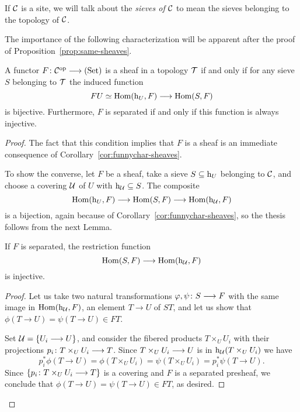 \begin{2   CONTRAVARIANT FUNCTORS}
\begin{2.3 Sheaves in Grothendieck topologies}
\begin{shaded}
\end{shaded}


If $\mathcal{C}$ is a site, we will talk about the \emph{sieves of $\mathcal{C}$} to mean the sieves belonging to the topology of $\mathcal{C}$.

The importance of the following characterization will be apparent after the proof of Proposition~\ref{prop:same-sheaves}.

\begin{proposition}\label{prop:funnychar-sheaves}%
%
%
A functor $F \colon \cC\op \arr \catset$ is a sheaf in a topology $\mathcal{T}$ if and only if for any sieve $S$ belonging to $\mathcal{T}$ the induced function
   \[
   FU \simeq \hom(\h_U, F) \arr  \hom(S, F)
   \]
is bijective. Furthermore, $F$ is separated if and only if this function is always injective.
\end{proposition}

\begin{proof}
The fact that this condition implies that $F$ is a sheaf is an immediate consequence of Corollary~\ref{cor:funnychar-sheaves}.

To show the converse, let $F$ be a sheaf, take a sieve $S \subseteq \mathrm{h}_{U}$ belonging to $\mathcal{C}$, and choose a covering $\mathcal{U}$ of $U$ with $\mathrm{h}_{\mathcal{U}} \subseteq S$. The composite
   \[
   \hom(\h_{U}, F) \arr \hom(S, F) \arr \hom(\h_{\cU}, F)
   \]
is a bijection, again because of Corollary~\ref{cor:funnychar-sheaves}, so the thesis follows from the next Lemma.

\begin{lemma}\label{lem:separated->injective}
If $F$ is separated, the restriction function
   \[
   \hom(S, F) \arr \hom(\h_{\cU}, F)
   \]
is injective.
\end{lemma}

\begin{proof}
Let us take two natural transformations $\phi, \psi \colon S \arr F$ with the same image in $\operatorname{Hom}(\mathrm{h}_{\mathcal{U}}, F)$, an element $T \to U$ of $ST$, and let us show that $\phi(T \to U) = \psi(T \to U) \in FT$.

Set $\mathcal{U} = \{U_{i} \longrightarrow U\}$, and consider the fibered products $T \times_{U} U_{i}$ with their projections $p_{i}\colon T \times_{U} U_{i} \arr T$. Since $T \times_{U} U_{i} \arr U$ is in $\mathrm{h}_{\mathcal{U}}(T \times_{U} U_{i})$ we have
   \[
   p_{i}^{*}\phi(T \to U) = \phi(T \times_{U} U_{i}) = 
   \psi(T \times_{U} U_{i}) = p_{i}^{*}\psi(T \to U).
   \]
Since $\{p_{i}\colon T \times_{U} U_{i} \arr T\}$ is a covering and $F$ is a separated presheaf, we conclude that $\phi(T \to U) = \psi(T \to U) \in FT$, as desired.
\end{proof}


\end{proof}
\end{2.3 Sheaves in Grothendieck topologies}
\end{2   CONTRAVARIANT FUNCTORS}
